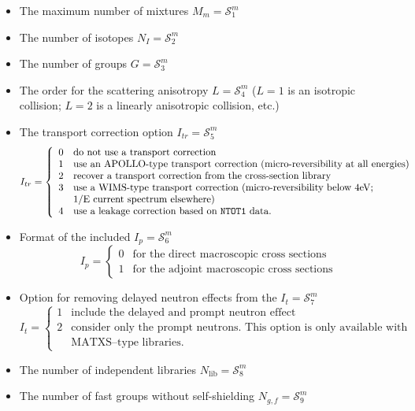 \begin{itemize}
\item The maximum number of mixtures $M_{m}=\mathcal{S}^{m}_{1}$
\item The number of isotopes $N_{I}=\mathcal{S}^{m}_{2}$ 
\item The number of groups ${G}=\mathcal{S}^{m}_{3}$ 
\item The order for the scattering anisotropy $L=\mathcal{S}^{m}_{4}$
($L=1$ is an isotropic collision; $L=2$ is a linearly anisotropic collision,
etc.)
\item The transport correction option $I_{tr}=\mathcal{S}^{m}_{5}$ 
\begin{displaymath}
I_{tr} = \left\{
\begin{array}{ll}
0 & \textrm{do not use a transport correction}\\
1 & \textrm{use an APOLLO-type transport correction (micro-reversibility at
all energies)}\\
2 & \textrm{recover a transport correction from the cross-section library}\\
3 & \textrm{use a WIMS-type transport correction (micro-reversibility below
4eV;}\\
  & \textrm{1/E current spectrum elsewhere)}\\
4 & \textrm{use a leakage correction based on {\tt NTOT1} data.}
\end{array} \right.
\end{displaymath}
\item Format of the included  $I_{p}=\mathcal{S}^{m}_{6}$
\begin{displaymath}
I_{p} = \left\{
\begin{array}{ll}
0 & \textrm{for the direct macroscopic cross sections} \\
1 & \textrm{for the adjoint macroscopic cross sections}
\end{array} \right.
\end{displaymath}
\item Option for removing delayed neutron effects from the 
$I_{t}=\mathcal{S}^{m}_{7}$ 
\begin{displaymath}
I_{t} = \left\{
\begin{array}{ll}
1 & \textrm{include the delayed and prompt neutron effect} \\
2 & \textrm{consider only the prompt neutrons. This option is only available
with}\\
& \textrm{MATXS--type libraries.}
\end{array} \right.
\end{displaymath}
\item The number of independent libraries $N_{\mathrm{lib}}=\mathcal{S}^{m}_{8}$ 
\item The number of fast groups without self-shielding $N_{g,f}=\mathcal{S}^{m}_{9}$ 


\end{itemize}

